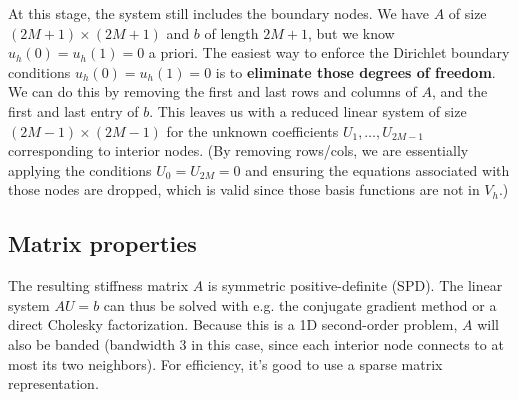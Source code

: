 \documentclass[a4paper,10pt]{article}
\begin{document}
At this stage, the system still includes the boundary nodes. We have \(A\) of size \((2M+1)\times(2M+1)\) and \(b\) of length \(2M+1\), but we know \(u_h(0)=u_h(1)=0\) a priori. 
The easiest way to enforce the Dirichlet boundary conditions \(u_h(0)=u_h(1)=0\) is to \textbf{eliminate those degrees of freedom}. 
We can do this by removing the first and last rows and columns of \(A\), and the first and last entry of \(b\).
This leaves us with a reduced linear system of size \((2M-1)\times(2M-1)\) for the unknown coefficients \(U_1,\dots,U_{2M-1}\) corresponding to interior nodes. (By removing rows/cols, we are essentially applying the conditions \(U_0=U_{2M}=0\) and ensuring the equations associated with those nodes are dropped, which is valid since those basis functions are not in \(V_h\).)

\subsection*{Matrix properties}
The resulting stiffness matrix \(A\) is symmetric positive-definite (SPD). 
The linear system \(A U = b\) can thus be solved with e.g. the conjugate gradient method or a direct Cholesky factorization. 
Because this is a 1D second-order problem, \(A\) will also be banded (bandwidth 3 in this case, since each interior node connects to at most its two neighbors). 
For efficiency, it's good to use a sparse matrix representation.
\end{document}
